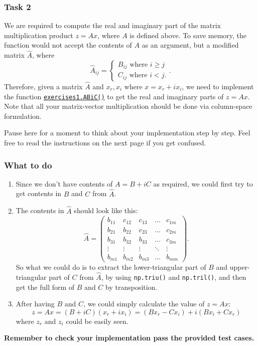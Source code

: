 \subsubsection*{Task 2}%
We are required to compute the real and imaginary part of the matrix multiplication product $z = Ax$, where  $A$ is defined above. To save memory, the function would not accept the contents of $A$ as an argument, but a modified matrix $\hat{A}$, where
\[
\hat{A}_{ij} = \left\{
  \begin{array}{l}
  B_{ij} \text{ where } i \ge j \\
  C_{ij} \text{ where } i < j.
  \end{array}
\right.
.\] 
Therefore, given a matrix $\hat{A}$ and $x_r, x_i$ where  $x = x_r + ix_i$, we need to implement the function \href{https://comp-lin-alg.github.io/cla_utils.html#cla_utils.exercises1.ABiC}{\texttt{exercises1.ABiC()}} to get the real and imaginary parts of \(z = Ax\). Note that all your matrix-vector multiplication should be done via column-space formulation. \medskip

\noindent Pause here for a moment to think about your implementation step by step. Feel free to read the instructions on the next page if you get confused.
\newpage
\subsubsection*{What to do}
\begin{enumerate}
\item Since we don't have contents of $A = B + iC$ as required, we could first try to get contents in $B$ and $C$ from $\hat{A}$.
\item The contents in $\hat{A}$ should look like this:
  \[
    \hat{A} = \begin{pmatrix} 
      b_{11} & c_{12} & c_{13} & \ldots & c_{1m} \\
      b_{21} & b_{22} & c_{23} & \ldots & c_{2m} \\
      b_{31} & b_{32} & b_{33} & \ldots & c_{3m} \\
      \vdots & \vdots & \vdots & \ddots & \vdots \\ 
      b_{m1} & b_{m2} & b_{m3} & \ldots & b_{mm}
    \end{pmatrix} 
  .\]
  So what we could do is to extract the lower-triangular part of $B$ and upper-triangular part of $C$ from $\hat{A}$, by using \texttt{np.triu()} and \texttt{np.tril()}, and then get the full form of $B$ and  $C$ by transposition.
 \item After having $B$ and $C$, we could simply calculate the value of  $z = Ax$:
    \[
      z = Ax = (B + iC)(x_r + ix_i) = (Bx_r - Cx_i) + i(Bx_i + Cx_r)
   \]
   where $z_r$ and $z_i$ could be easily seen. \checked
\end{enumerate}
\textbf{Remember to check your implementation pass the provided test cases.}
